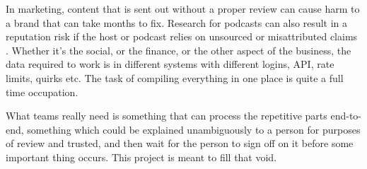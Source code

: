 In marketing, content that is sent out without a proper review can cause harm to a brand that can take months to fix. Research for podcasts can also result in a reputation risk if the host or podcast relies on unsourced or misattributed claims \cite{cove,marketingfm}. Whether it's the social, or the finance, or the other aspect of the business, the data required to work is in different systems with different logins, API, rate limits, quirks etc. The task of compiling everything in one place is quite a full time occupation.

What teams really need is something that can process the repetitive parts end-to-end, something which could be explained unambiguously to a person for purposes of review and trusted, and then wait for the person to sign off on it before some important thing occurs. This project is meant to fill that void.

